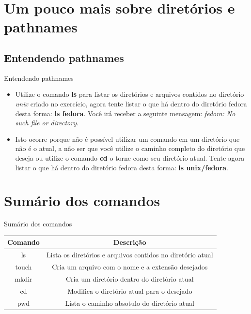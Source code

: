 \documentclass{beamer}
\begin{document}
\section{Um pouco mais sobre diretórios e pathnames}

\subsection{Entendendo pathnames}
 \begin{frame}{Entendendo pathnames}
  \begin{itemize}
  \item {
   Utilize o comando \textbf{ls} para listar os diretórios e arquivos contidos no diretório \textit{unix} criado no exercício, agora tente listar o que há dentro do diretório fedora desta forma: \textbf{ls fedora}. Você irá receber a seguinte mensagem: \textit{fedora: No such file or directory}.}
   \item{Isto ocorre porque não é possível utilizar um comando em um diretório que não é o atual, a não ser que você utilize o caminho completo do diretório que deseja ou utilize o comando \textbf{cd} o torne como seu diretório atual. Tente agora listar o que há dentro do diretório fedora desta forma: \textbf{ls unix/fedora}.}
 \end{itemize}
\end{frame}

\section*{Sumário dos comandos}

\begin{frame}{Sumário dos comandos}
 \begin{center}
 \begin{tabular}{||c | c||} 
 \hline
 Comando & Descri\c{c}ão\\ [0.5ex] 
 \hline\hline
 ls & Lista os diretórios e arquivos contidos no diretório atual\\ 
 \hline
 touch & Cria um arquivo com o nome e a extensão desejados\\
 \hline
 mkdir & Cria um diretório dentro do diretório atual\\
 \hline
 cd & Modifica o diretório atual para o desejado\\
 \hline
 pwd & Lista o caminho absotulo do diretório atual  \\
 \hline
\end{tabular}
\end{center}
\end{frame}
\end{document}
